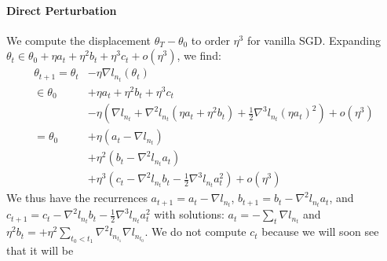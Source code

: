 \documentclass[openany, notitlepage, justified]{tufte-book}
\theoremstyle{plain}
\theoremstyle{definition}
\newcommand{\wrap}[1]{\left(#1\right)}
\begin{document}
            \paragraph{Direct Perturbation}
            \begin{shaded}
                We compute the displacement $\theta_T-\theta_0$ to order $\eta^3$ 
                for vanilla SGD.  Expanding
                $
                    \theta_t \in \theta_0 + \eta a_t + \eta^2 b_t + \eta^3 c_t 
                    + o(\eta^3)
                $, we find:
                \begin{align*}
                    \theta_{t+1}
                    =
                    \theta_t    &-  \eta \nabla l_{n_t} (\theta_t) \\
                    \in\theta_0 &+  \eta a_t + \eta^2 b_t + \eta^3 c_t \\
                                &-  \eta \wrap{
                                         \nabla l_{n_t}
                                        +\nabla^2 l_{n_t} (\eta a_t + \eta^2 b_t)
                                        +\frac{1}{2} \nabla^3 l_{n_t} (\eta a_t)^2
                                    }
                                 +  o(\eta^3) \\
                    =
                    \theta_0    &+   \eta   \wrap{a_t - \nabla l_{n_t}} \\
                                &+   \eta^2 \wrap{b_t - \nabla^2 l_{n_t} a_t} \\ 
                                &+   \eta^3 \wrap{
                                         c_t
                                        -\nabla^2 l_{n_t} b_t
                                        -\frac{1}{2} \nabla^3 l_{n_t} a_t^2
                                     }
                                 +   o(\eta^3)
                \end{align*}
                We thus have the recurrences
                $
                    a_{t+1} = a_t - \nabla l_{n_t}
                $,
                $
                    b_{t+1} = b_t - \nabla^2 l_{n_t} a_t
                $, and
                $
                    c_{t+1} = c_t -\nabla^2 l_{n_t} b_t 
                                  -\frac{1}{2} \nabla^3 l_{n_t} a_t^2
                $
                with solutions:
                $a_t = -\sum_{t} \nabla l_{n_t}$ and
                $\eta^2 b_t = +\eta^2 \sum_{t_0 < t_1} \nabla^2 l_{n_{t_1}} \nabla l_{n_{t_0}}$.
                We do not compute $c_t$ because we will soon see that it will be

\end{shaded}
\end{document}
